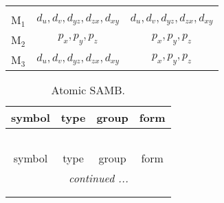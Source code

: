 \documentclass[fleqn,10pt,landscape]{article}
\begin{document}
\begin{itemize}
\begin{center}
\begin{longtable}{c|c|c}
 \hline \hline
\multicolumn{2}{r}{} \\ \endlastfoot

M$_{1}$ & $d_{u}, d_{v}, d_{yz}, d_{zx}, d_{xy}$ & $d_{u}, d_{v}, d_{yz}, d_{zx}, d_{xy}$ \\
M$_{2}$ & $p_{x}, p_{y}, p_{z}$ & $p_{x}, p_{y}, p_{z}$ \\
M$_{3}$ & $d_{u}, d_{v}, d_{yz}, d_{zx}, d_{xy}$ & $p_{x}, p_{y}, p_{z}$ \\
\end{longtable}
\end{center}
\begin{center}
\renewcommand{\arraystretch}{1.3}
\begin{longtable}{c|c|c|c}
\caption{Atomic SAMB.}
 \\
 \hline \hline
symbol & type & group & form \\ \hline \endfirsthead

\multicolumn{3}{l}{\tablename\ \thetable{}} \\
 \hline \hline
symbol & type & group & form \\ \hline \endhead

 \hline \hline
\multicolumn{3}{r}{\footnotesize\it continued ...} \\ \endfoot

 \hline \hline
\multicolumn{3}{r}{} \\ \endlastfoot


\end{longtable}
\end{center}
\end{itemize}
\end{document}
